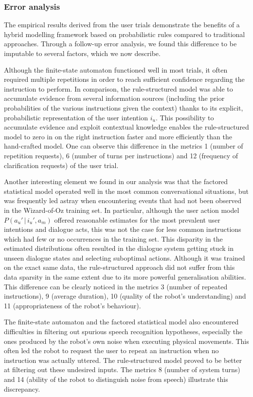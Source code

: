 \subsubsection*{Error analysis}

The empirical results derived from the user trials demonstrate the benefits of a hybrid modelling framework based on probabilistic rules compared to traditional approaches. Through a follow-up error analysis, we found this difference to be imputable to several factors, which we now describe.

Although the finite-state automaton functioned well in most trials, it often required multiple repetitions in order to reach sufficient confidence regarding the instruction to perform.  In comparison, the rule-structured model was able to accumulate evidence from several information sources (including the prior probabilities of the various instructions given the context) thanks to its explicit, probabilistic representation of the user intention $i_u$.  This possibility to accumulate evidence and exploit contextual knowledge enables the rule-structured model to zero in on the right instruction faster and more efficiently than the hand-crafted model. One can observe this difference in the metrics 1 (number of repetition requests), 6 (number of turns per instructions) and 12 (frequency of clarification requests) of the user trial.  

Another interesting element we found in our analysis was that the factored statistical model operated well in the most common conversational situations, but was frequently led astray when encountering events that had not been observed in the Wizard-of-Oz training set. In particular, although the user action model $P(a_u'\, | \, i_u', a_m)$ offered reasonable estimates for the most prevalent user intentions and dialogue acts, this was not the case for less common instructions which had few or no occurrences in the training set.  This disparity in the estimated distributions often resulted in the dialogue system getting stuck in unseen dialogue states and selecting suboptimal actions.  Although it was trained on the exact same data, the rule-structured approach did not suffer from this data sparsity in the same extent due to its more powerful generalisation abilities. This difference can be clearly noticed in the metrics 3 (number of repeated instructions), 9 (average duration), 10 (quality of the robot's understanding) and 11 (appropriateness of the robot's behaviour). 

The finite-state automaton and the factored statistical model also encountered difficulties in filtering out spurious speech recognition hypotheses, especially the ones produced by the robot's own noise when executing physical movements.  This often led the robot to request the user to repeat an instruction when no instruction was actually uttered.  The rule-structured model proved to be better at filtering out these undesired inputs.  The metrics 8 (number of system turns) and 14 (ability of the robot to distinguish noise from speech) illustrate this discrepancy. 

